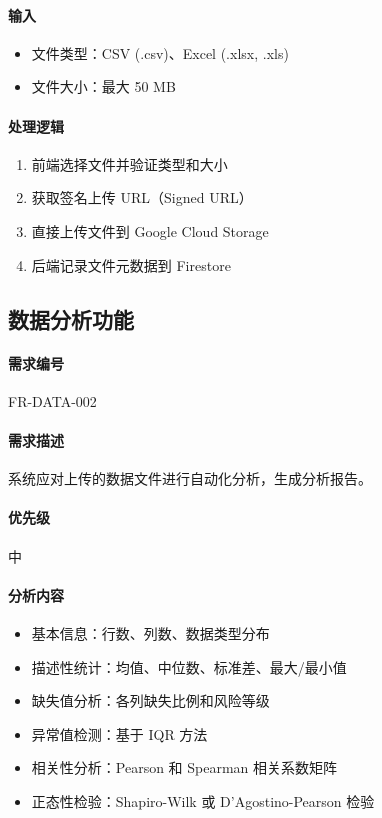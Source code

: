 \paragraph{输入}
\begin{itemize}
    \item 文件类型：CSV (.csv)、Excel (.xlsx, .xls)
    \item 文件大小：最大 50 MB
\end{itemize}

\paragraph{处理逻辑}
\begin{enumerate}
    \item 前端选择文件并验证类型和大小
    \item 获取签名上传 URL（Signed URL）
    \item 直接上传文件到 Google Cloud Storage
    \item 后端记录文件元数据到 Firestore
\end{enumerate}

\subsection{数据分析功能}

\paragraph{需求编号} FR-DATA-002

\paragraph{需求描述} 系统应对上传的数据文件进行自动化分析，生成分析报告。

\paragraph{优先级} 中

\paragraph{分析内容}
\begin{itemize}
    \item 基本信息：行数、列数、数据类型分布
    \item 描述性统计：均值、中位数、标准差、最大/最小值
    \item 缺失值分析：各列缺失比例和风险等级
    \item 异常值检测：基于 IQR 方法
    \item 相关性分析：Pearson 和 Spearman 相关系数矩阵
    \item 正态性检验：Shapiro-Wilk 或 D'Agostino-Pearson 检验
\end{itemize}

